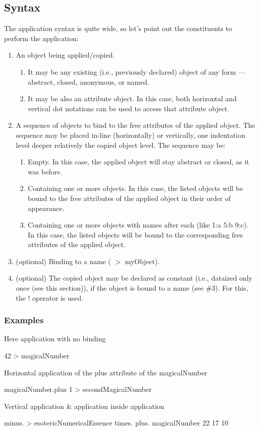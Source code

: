 \documentclass[12pt]{book}
\begin{document}
\subsection{Syntax}
The application syntax is quite wide, so let's point out the constituents to perform the application:

\begin{enumerate}
    \item An object being applied/copied.
    \begin{enumerate}
        \item It may be any existing (i.e., previously declared) object of any form — abstract, closed, anonymous, or named.
        \item It may be also an attribute object. In this case, both horizontal and vertical dot notations can be used to access that attribute object.
    \end{enumerate}
    \item A sequence of objects to bind to the free attributes of the applied object. The sequence may be placed in-line (horizontally) or vertically, one indentation level deeper relatively the copied object level. The sequence may be:
    \begin{enumerate}
        \item Empty. In this case, the applied object will stay abstract or closed, as it was before.
        \item Containing one or more objects. In this case, the listed objects will be bound to the free attributes of the applied object in their order of appearance.
        \item Containing one or more objects with names after each (like 1:a 5:b 9:c). In this case, the listed objects will be bound to the corresponding free attributes of the applied object.
    \end{enumerate}
    \item (optional) Binding to a name ( $>$ myObject).
    \item (optional) The copied object may be declared as constant (i.e., dataized only once (see this section)), if the object is bound to a name (see \#3). For this, the ! operator is used.
\end{enumerate}

\subsubsection{Examples}

Here application with no binding
\begin{ffcode}
42 > magicalNumber
\end{ffcode}
Horizontal application of the plus attribute of the magicalNumber
\begin{ffcode}
magicalNumber.plus 1 > secondMagicalNumber
\end{ffcode}
Vertical application \& application inside application
\begin{ffcode}
minus. > esotericNumericalEssence
  times.
    plus.
      magicalNumber
      22
    17
  10
\end{ffcode}
\end{document}

